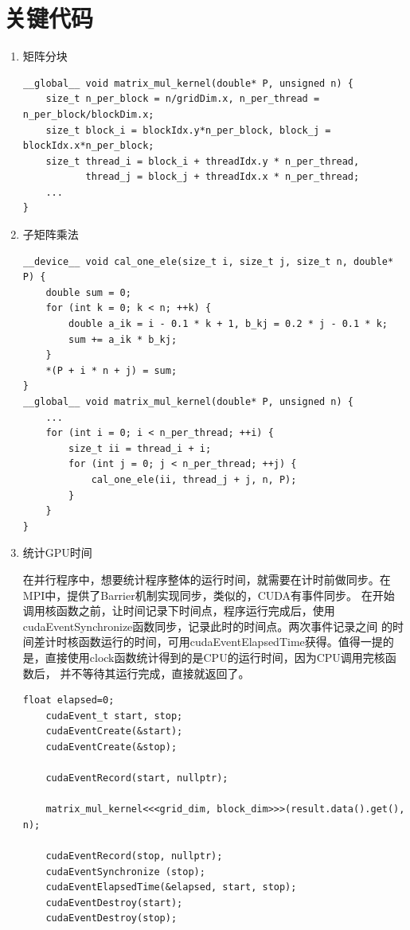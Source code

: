 \documentclass[10pt,letterpaper]{ctexart}
\begin{document}
\section{关键代码}
\begin{enumerate}[itemindent=2em, label=\arabic*、]
    \item 矩阵分块
\begin{lstlisting}[caption=矩阵分块,captionpos=b]
__global__ void matrix_mul_kernel(double* P, unsigned n) {
    size_t n_per_block = n/gridDim.x, n_per_thread = n_per_block/blockDim.x;
    size_t block_i = blockIdx.y*n_per_block, block_j = blockIdx.x*n_per_block;
    size_t thread_i = block_i + threadIdx.y * n_per_thread,
           thread_j = block_j + threadIdx.x * n_per_thread;
    ...
}
\end{lstlisting}
    \item 子矩阵乘法
\begin{lstlisting}[caption=计算结果矩阵,captionpos=b]
__device__ void cal_one_ele(size_t i, size_t j, size_t n, double* P) {
    double sum = 0;
    for (int k = 0; k < n; ++k) {
        double a_ik = i - 0.1 * k + 1, b_kj = 0.2 * j - 0.1 * k;
        sum += a_ik * b_kj;
    }
    *(P + i * n + j) = sum;
}
__global__ void matrix_mul_kernel(double* P, unsigned n) {
    ...
    for (int i = 0; i < n_per_thread; ++i) {
        size_t ii = thread_i + i;
        for (int j = 0; j < n_per_thread; ++j) {
            cal_one_ele(ii, thread_j + j, n, P);
        }
    }
}
\end{lstlisting}    
    \item 统计GPU时间
    \par \qquad 在并行程序中，想要统计程序整体的运行时间，就需要在计时前做同步。在MPI中，提供了Barrier机制实现同步，类似的，CUDA有事件同步。
    在开始调用核函数之前，让时间记录下时间点，程序运行完成后，使用cudaEventSynchronize函数同步，记录此时的时间点。两次事件记录之间
    的时间差计时核函数运行的时间，可用cudaEventElapsedTime获得。值得一提的是，直接使用clock函数统计得到的是CPU的运行时间，因为CPU调用完核函数后，
    并不等待其运行完成，直接就返回了。
\begin{lstlisting}[caption=用事件统计程序运行时间,captionpos=b]
    float elapsed=0;
    cudaEvent_t start, stop;
    cudaEventCreate(&start);
    cudaEventCreate(&stop);

    cudaEventRecord(start, nullptr);

    matrix_mul_kernel<<<grid_dim, block_dim>>>(result.data().get(), n);

    cudaEventRecord(stop, nullptr);
    cudaEventSynchronize (stop);
    cudaEventElapsedTime(&elapsed, start, stop);
    cudaEventDestroy(start);
    cudaEventDestroy(stop);
\end{lstlisting}

\end{enumerate}
\end{document}
